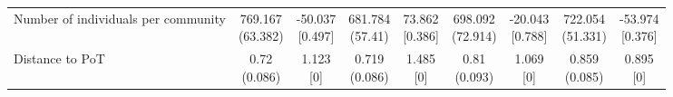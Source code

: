 {\begin{tabular}[t]{lcccccccc}
\hspace{1em}Number of individuals per community & \makecell[c]{769.167\\(63.382)} & \makecell[c]{-50.037\\{[0.497]}} & \makecell[c]{681.784\\(57.41)} & \makecell[c]{73.862\\{[0.386]}} & \makecell[c]{698.092\\(72.914)} & \makecell[c]{-20.043\\{[0.788]}} & \makecell[c]{722.054\\(51.331)} & \makecell[c]{-53.974\\{[0.376]}}\\
\hspace{1em}Distance to PoT & \makecell[c]{0.72\\(0.086)} & \makecell[c]{1.123\\{[0]}} & \makecell[c]{0.719\\(0.086)} & \makecell[c]{1.485\\{[0]}} & \makecell[c]{0.81\\(0.093)} & \makecell[c]{1.069\\{[0]}} & \makecell[c]{0.859\\(0.085)} & \makecell[c]{0.895\\{[0]}}\\
\bottomrule
\end{tabular}}

